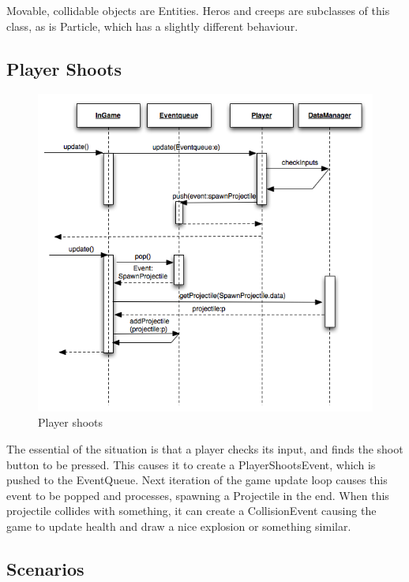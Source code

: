 Movable, collidable objects are Entities. Heros and creeps are subclasses
of this class, as is Particle, which has a slightly different behaviour.

\subsection{Player Shoots}
\begin{figure}[H]
	\begin{center}
		\includegraphics[scale=0.75]{graphics/PlayerShoots}
	\end{center}
        \caption{Player shoots}
\end{figure}

The essential of the situation is that a player checks its input, and finds the shoot button to be
pressed. This causes it to create a PlayerShootsEvent, which is pushed to the
EventQueue. Next iteration of the game update loop causes this event to be
popped and processes, spawning a Projectile in the end. When this projectile
collides with something, it can create a CollisionEvent causing the game
to update health and draw a nice explosion or something similar.

\subsection{Scenarios}

